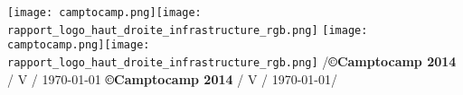 \usepackage{lastpage}
\usepackage[headsepline,footsepline]{scrlayer-scrpage}


\newcommand{\ctoclogo}{\texttt{[image: camptocamp.png]}}
\newcommand{\ctocinfralogo}{\texttt{[image: rapport\_logo\_haut\_droite\_infrastructure\_rgb.png]}}
\newcommand{\ctocinfraheader}{\ctoclogo\hfill{}\ctocinfralogo}

\usepackage[ddmmyyyy]{datetime}
\renewcommand{\dateseparator}{.}

\newcommand{\footerstyle}{\color{c2c}\normalfont\scriptsize}
\newcommand{\ctoccopyright}{\textbf{\copyright Camptocamp 2014} /  V\docversion{} / \today}
\newcommand{\pagenum}{\pagemark/\pageref{LastPage}}

%
  {%
    {\ctocinfraheader}
    {\ctocinfraheader}
    {}
  }%
  {%
    {\footerstyle\pagenum\hfill\ctoccopyright}
    {\footerstyle\ctoccopyright\hfill\pagenum}
    {}
  } %

\pagestyle{c2c}
\renewcommand*{\chapterpagestyle}{c2c}
